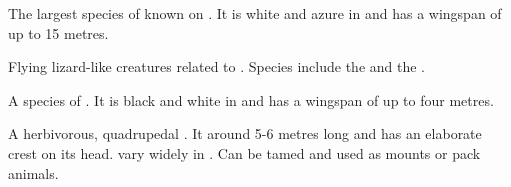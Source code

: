 \begin{gloss}







\begin{comment}
\paragraph{\quilrai}
\end{comment}
\gitem[\quilrais]{\quilrai}
The largest species of  known on \Miith{}.
It is white and azure in \colour and has a wingspan of up to 15 metres. 









\begin{comment}
\paragraph{pteran}
\end{comment}
Flying lizard-like creatures related to . 
Species include the \ravcor{} and the \quilrai. 










\begin{comment}
\paragraph{\ravcor}
\end{comment}
\gitem{\ravcor}
A species of . 
It is black and white in \colour and has a wingspan of up to four metres. 







\begin{comment}
\paragraph{\relc}
\end{comment}
\gitem[\relcs]{\relc}
A herbivorous, quadrupedal . 
It around 5-6 metres long and has an elaborate crest on its head. 
\Relcs{} vary widely in \colour. 
Can be tamed and used as mounts or pack animals. 


\end{gloss}
